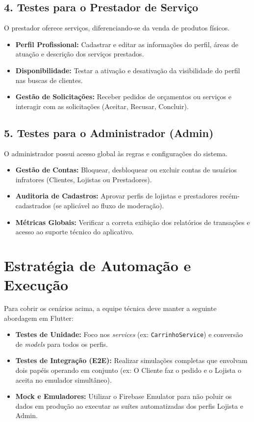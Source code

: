 \documentclass[a4paper,12pt]{article}
\begin{document}
\subsection{4. Testes para o Prestador de Serviço}
O prestador oferece serviços, diferenciando-se da venda de produtos físicos.
\begin{itemize}
    \item \textbf{Perfil Profissional:} Cadastrar e editar as informações do perfil, áreas de atuação e descrição dos serviços prestados.
    \item \textbf{Disponibilidade:} Testar a ativação e desativação da visibilidade do perfil nas buscas de clientes.
    \item \textbf{Gestão de Solicitações:} Receber pedidos de orçamentos ou serviços e interagir com as solicitações (Aceitar, Recusar, Concluir).
\end{itemize}

\subsection{5. Testes para o Administrador (Admin)}
O administrador possui acesso global às regras e configurações do sistema.
\begin{itemize}
    \item \textbf{Gestão de Contas:} Bloquear, desbloquear ou excluir contas de usuários infratores (Clientes, Lojistas ou Prestadores).
    \item \textbf{Auditoria de Cadastros:} Aprovar perfis de lojistas e prestadores recém-cadastrados (se aplicável ao fluxo de moderação).
    \item \textbf{Métricas Globais:} Verificar a correta exibição dos relatórios de transações e acesso ao suporte técnico do aplicativo.
\end{itemize}

\section{Estratégia de Automação e Execução}

Para cobrir os cenários acima, a equipe técnica deve manter a seguinte abordagem em Flutter:
\begin{itemize}
    \item \textbf{Testes de Unidade:} Foco nos \textit{services} (ex: \texttt{CarrinhoService}) e conversão de \textit{models} para todos os perfis.
    \item \textbf{Testes de Integração (E2E):} Realizar simulações completas que envolvam dois papéis operando em conjunto (ex: O Cliente faz o pedido e o Lojista o aceita no emulador simultâneo).
    \item \textbf{Mock e Emuladores:} Utilizar o Firebase Emulator para não poluir os dados em produção ao executar as suítes automatizadas dos perfis Lojista e Admin.
\end{itemize}
\end{document}
